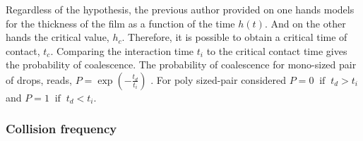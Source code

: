 Regardless of the hypothesis, the previous author provided on one hands models for the thickness of the film as a function of the time $h(t)$.
And on the other hands the critical value, $h_c$.
Therefore, it is possible to obtain a critical time of contact, $t_c$. 
Comparing the interaction time $t_i$ to the critical contact time gives the probability of coalescence.
The probability of coalescence for mono-sized pair of drops, reads, $P = \exp(-\frac{t_d}{t_i})$ \citep{chesters1991modelling}.
For poly sized-pair \citet{KAMP20011363} considered  $P = 0\;\;\text{if}\;\;t_d > t_i$ and $P = 1\;\;\text{if}\;\;t_d < t_i$.






\subsubsection{Collision frequency}

